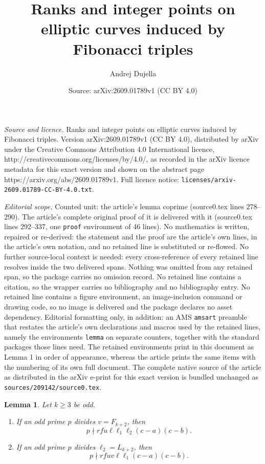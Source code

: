 \documentclass[10pt,a4paper]{amsart}
\title{Ranks and integer points on elliptic curves induced by Fibonacci triples}
\author{Andrej Dujella}
\date{Source: arXiv:2609.01789v1 (CC BY 4.0)}
\newtheorem{lemma}{Lemma}
\begin{document}
\maketitle

\noindent\emph{Source and licence.} Ranks and integer points on elliptic curves induced by Fibonacci triples. Version arXiv:2609.01789v1 (CC BY 4.0), distributed by arXiv under the Creative Commons Attribution 4.0 International licence, http://creativecommons.org/licenses/by/4.0/, as recorded in the arXiv licence metadata for this exact version and shown on the abstract page https://arxiv.org/abs/2609.01789v1. Full licence notice: \texttt{licenses/arxiv-2609.01789-CC-BY-4.0.txt}.\par\smallskip

\noindent\textit{Editorial scope.} Counted unit: the article's lemma coprime (source0.tex lines 278--290). The article's complete original proof of it is delivered with it (source0.tex lines 292--337, one \texttt{proof} environment of 46 lines). No mathematics is written, repaired or re-derived: the statement and the proof are the article's own lines, in the article's own notation, and no retained line is substituted or re-flowed.  No further source-local context is needed: every cross-reference of every retained line resolves inside the two delivered spans.  Nothing was omitted from any retained span, so the package carries no omission record.  No retained line contains a citation, so the wrapper carries no bibliography and no bibliography entry.  No retained line contains a figure environment, an image-inclusion command or drawing code, so no image is delivered and the package declares no asset dependency.  Editorial formatting only, in addition: an AMS \texttt{amsart} preamble that restates the article's own declarations and macros used by the retained lines, namely the environments \texttt{lemma} on separate counters, together with the standard packages those lines need.  The retained environments print in this document as Lemma 1 in order of appearance, whereas the article prints the same items with the numbering of its own full document.  The complete native source of the article as distributed in the arXiv e-print for this exact version is bundled unchanged as \texttt{sources/209142/source0.tex}.
\begin{lemma}\label{coprime}
Let $k\geq3$ be odd.
\begin{enumerate}[label={\rm (\roman*)}]
\item If an odd prime $p$ divides $v=F_{k+2}$, then
\[
 p\nmid rfu\ell\ell_1\ell_2(c-a)(c-b).
\]
\item If an odd prime $p$ divides $\ell_2=L_{k+2}$, then
\[
 p\nmid rfuv\ell\ell_1(c-a)(c-b).
\]
\end{enumerate}
\end{lemma}
\end{document}
